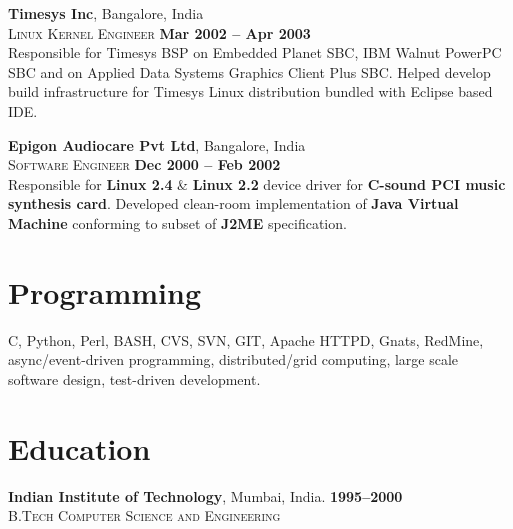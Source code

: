 \documentclass[margin,line]{resume}
\begin{document}
\begin{resume}
    \textbf{Timesys Inc}, Bangalore, India \\\vspace{1mm}%
    \textsc{Linux Kernel Engineer} \hfill \textbf{Mar 2002 -- Apr 2003}\\
    Responsible for Timesys BSP on Embedded Planet SBC, IBM Walnut
    PowerPC SBC and on Applied Data Systems Graphics Client Plus SBC.
    Helped develop build infrastructure for Timesys Linux distribution
    bundled with Eclipse based IDE.

    \textbf{Epigon Audiocare Pvt Ltd}, Bangalore, India \\\vspace{1mm}%
    \textsc{Software Engineer} \hfill \textbf{Dec 2000 -- Feb 2002}\\
    Responsible for {\bf Linux 2.4} \& {\bf Linux 2.2} device driver
    for {\bf C-sound PCI music synthesis card}. Developed clean-room
    implementation of {\bf Java Virtual Machine} conforming to subset
    of {\bf J2ME} specification.
    

    \section{\mysidestyle Programming} 

    C, Python, Perl, BASH, CVS, SVN, GIT, Apache HTTPD, Gnats, RedMine,
    async/event-driven programming, distributed/grid computing, large scale
    software design, test-driven development.


    \section{\mysidestyle Education}
	\textbf{Indian Institute of Technology}, Mumbai, India. \hfill \textbf{1995--2000}\\
	\textsc{B.Tech Computer Science and Engineering} \\


\end{resume}
\end{document}
